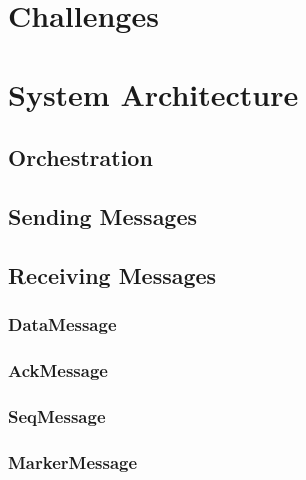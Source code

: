 \documentclass{article}
\begin{document}
\section{Challenges}











\section{System Architecture}

\subsection{Orchestration}

\subsection{Sending Messages}

\subsection{Receiving Messages}

\subsubsection{DataMessage}


\subsubsection{AckMessage}





\subsubsection{SeqMessage}


\subsubsection{MarkerMessage}
\end{document}

